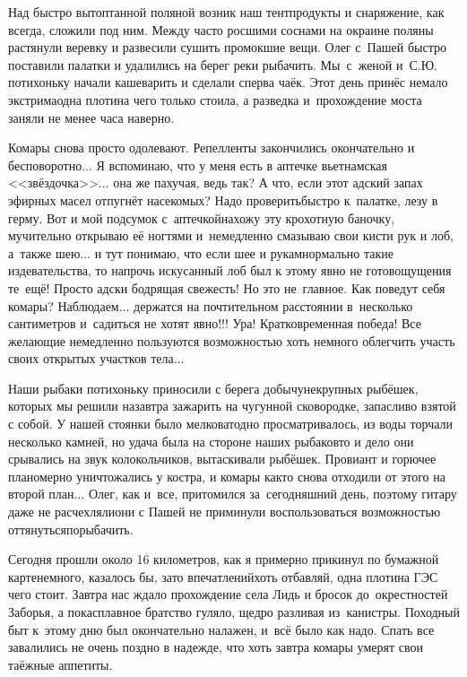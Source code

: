 Над быстро вытоптанной поляной возник наш тент\mdash продукты и снаряжение, как всегда, сложили под ним. Между часто росшими соснами на окраине поляны растянули веревку и развесили сушить промокшие вещи. Олег с~Пашей быстро поставили палатки и удалились на берег реки рыбачить. Мы~с~женой и~С.Ю. потихоньку начали кашеварить и сделали сперва чаёк. Этот день принёс немало экстрима\mdash одна плотина чего только стоила, а разведка и~прохождение моста заняли не менее часа наверно. 

Комары снова просто одолевают. Репелленты закончились окончательно и бесповоротно$\ldots$ Я вспоминаю, что у меня есть в аптечке вьетнамская <<звёздочка>>$\ldots$ она же пахучая, ведь так? А что, если этот адский запах эфирных масел отпугнёт насекомых? Надо проверить\mdash быстро к~палатке, лезу в герму. Вот и мой подсумок с~аптечкой\mdash нахожу эту крохотную баночку, мучительно открываю её ногтями и~немедленно смазываю свои кисти рук и лоб, а~также шею$\ldots$ и тут понимаю, что если шее и рукам\mdash нормально такие издевательства, то напрочь искусанный лоб был к этому явно не готов\mdash ощущения те~ещё! Просто адски бодрящая свежесть! Но это не~главное. Как поведут себя комары? Наблюдаем$\ldots$ держатся на почтительном расстоянии в~несколько сантиметров и~садиться не хотят явно!!! Ура! Кратковременная победа! Все желающие немедленно пользуются возможностью хоть немного облегчить участь своих открытых участков тела$\ldots$

Наши рыбаки потихоньку приносили с берега добычу\mdash некрупных рыбёшек, которых мы решили назавтра зажарить на чугунной сковородке, запасливо взятой с собой. У нашей стоянки было мелковато\mdash дно просматривалось, из воды торчали несколько камней, но удача была на стороне наших рыбаков\mdash то и дело они срывались на звук колокольчиков, вытаскивали рыбёшек. Провиант и горючее планомерно уничтожались у костра, и комары как\sdash то снова отходили от этого на второй план$\ldots$ Олег, как и~все, притомился за~сегодняшний день, поэтому гитару даже не расчехляли\mdash они с Пашей не приминули воспользоваться возможностью оттянуться\mdash порыбачить. 

Сегодня прошли около 16 километров, как я примерно прикинул по бумажной карте\mdash немного, казалось бы, зато впечатлений\mdash хоть отбавляй, одна плотина ГЭС чего стоит. Завтра нас ждало прохождение села Лидь и бросок до~окрестностей Заборья, а пока\mdash сплавное братство гуляло, щедро разливая из~канистры. Походный быт к~этому дню был окончательно налажен, и~всё было как надо. Спать все завалились не очень поздно в надежде, что хоть завтра комары умерят свои таёжные аппетиты.

\begin{center}
\end{center}
